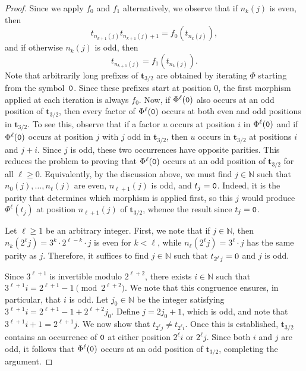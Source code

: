 \documentclass[12pt,reqno]{article}
\newcommand{\N}{\mathbb{N}}
\begin{document}
\begin{proof}
Since we apply $f_0$ and $f_1$ alternatively, we observe that if $n_k(j)$ is even, then
\[
  t_{n_{k+1}(j)} t_{n_{k+1}(j)+1}=f_0(t_{n_k(j)}),
\]
and if otherwise $n_k(j)$ is odd,  then
\[
  t_{n_{k+1}(j)}=f_1(t_{n_k(j)}).
\]
Note that arbitrarily long prefixes of $\mathbf{t}_{3/2}$ are obtained by iterating $\Phi$ starting from the symbol~${\tt 0}$.
Since these prefixes start at position $0$, the first morphism applied at each iteration is always $f_0$.
Now, if $\Phi^\ell({\tt 0})$ also occurs at an odd position of $\mathbf{t}_{3/2}$, then every factor of $\Phi^\ell({\tt 0})$ occurs at both even and odd positions in $\mathbf{t}_{3/2}$.
To see this, observe that if a factor $u$ occurs at position $i$ in $\Phi^\ell({\tt 0})$ and if $\Phi^\ell({\tt 0})$ occurs at position $j$ with $j$ odd in $\mathbf{t}_{3/2}$, then $u$ occurs in $\mathbf{t}_{3/2}$ at positions $i$ and $j+i$.
Since $j$ is odd, these two occurrences have opposite parities.
This reduces the problem to proving that $\Phi^\ell({\tt 0})$ occurs at an odd position of $\mathbf{t}_{3/2}$ for all $\ell \ge 0$.
Equivalently, by the discussion above, we must find $j \in \N$ such that $n_0(j), \dots, n_\ell(j)$ are even, $n_{\ell+1}(j)$ is odd, and $t_j = {\tt 0}$.
Indeed, it is the parity that determines which morphism is applied first, so this $j$ would produce $\Phi^\ell(t_j)$ at position $n_{\ell+1}(j)$ of $\mathbf{t}_{3/2}$, whence the result since $t_j = {\tt 0}$.
\medskip

Let $\ell \ge 1$ be an arbitrary integer.
First, we note that if $j \in \N$, then $n_k(2^{\ell} j) = 3^k \cdot 2^{\ell-k} \cdot j$ is even for $k < \ell$, while $n_\ell(2^\ell j) = 3^\ell \cdot j$ has the same parity as $j$.
Therefore, it suffices to find $j \in \N$ such that $t_{2^\ell j} = {\rm 0}$ and $j$ is odd.

Since $3^{\ell+1}$ is invertible modulo $2^{\ell+2}$, there exists $i \in \N$ such that $3^{\ell+1} i = 2^{\ell+1} - 1 \pmod{2^{\ell+2}}$.
We note that this congruence ensures, in particular, that $i$ is odd.
Let $j_0 \in \N$ be the integer satisfying $3^{\ell+1} i = 2^{\ell+1} - 1 + 2^{\ell+2}j_0$.
Define $j = 2j_0+1$, which is odd, and note that $3^{\ell+1} i + 1 = 2^{\ell+1} j$.
We now show that $t_{2^\ell j} \neq t_{2^\ell i}$.
Once this is established, $\mathbf{t}_{3/2}$ contains an occurrence of ${\tt 0}$ at either position $2^\ell i$ or $2^\ell j$.
Since both $i$ and $j$ are odd, it follows that $\Phi^\ell({\tt 0})$ occurs at an odd position of $\mathbf{t}_{3/2}$, completing the argument.



\end{proof}
\end{document}
